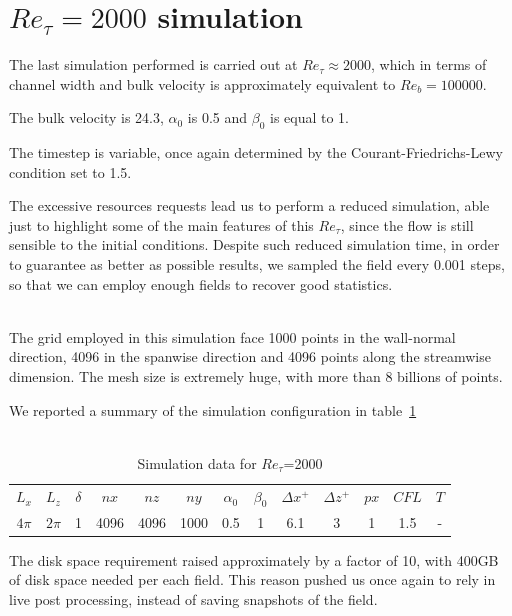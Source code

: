 \section{$Re_{\tau}=2000$ simulation} 
The last simulation performed is carried out at $Re_{\tau}\approx2000$, which in terms of channel width and bulk velocity is approximately equivalent to $Re_{b}=100000$.\par
The bulk velocity is 24.3, $\alpha_{0}$ is 0.5 and $\beta_{0}$ is equal to 1.\par
The timestep is variable, once again determined by the Courant-Friedrichs-Lewy condition set to 1.5.\par
The excessive resources requests lead us to perform a reduced simulation, able just to highlight some of the main features of this $Re_{\tau}$, since the flow is still sensible to the initial conditions. Despite such reduced simulation time, in order to guarantee as better as possible results, we sampled the field every 0.001 steps, so that we can employ enough fields to recover good statistics.\\~\par
The grid employed in this simulation face 1000 points in the wall-normal direction, 4096 in the spanwise direction and 4096 points along the streamwise dimension. The mesh size is extremely huge, with more than 8 billions of points.\par
We reported a summary of the simulation configuration in table~\ref{table:2000}\\~\par

\begin{table}
\caption{Simulation data for $Re_{\tau}$=2000}
\begin{center}
\begin{tabular}{ccccccccccccc}
\toprule
$L_{x}$ & $L_{z}$ & $\delta$ & $nx$ & $nz$ & $ny$ & $\alpha_{0}$ & $\beta_{0}$ & $\Delta x^{+}$ & $\Delta z^{+}$ & $px$ & $CFL$ & $T$\\
$4\pi$ & $2\pi$ & 1 & 4096 & 4096 & 1000 & 0.5 & 1 & 6.1  & 3 & 1 & 1.5 & - \\
\bottomrule
\end{tabular}
\end{center}
\label{table:2000}
\end{table}


The disk space requirement raised approximately by a factor of 10, with 400GB of disk space needed per each field. This reason pushed us once again to rely in live post processing, instead of saving snapshots of the field.\\~\par

